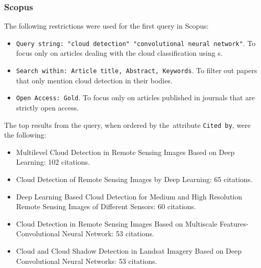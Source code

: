 \subsubsection{Scopus}
\label{cloud-detection-scopus}

The following restrictions were used for the first query in Scopus:

\begin{itemize}
	\item \verb|Query string: "cloud detection" "convolutional neural network"|. To focus on\-ly on articles dealing with the cloud classification using s.
	\item \verb|Search within: Article title, Abstract, Keywords|. To filter out papers that only mention cloud detection in their bodies.
	\item \verb|Open Access: Gold|. To focus only on articles published in journals that are strictly open access.
\end{itemize}

\noindent The top results from the query, when ordered by the~attribute \verb|Cited by|, were the following:

\begin{itemize}
	\item Multilevel Cloud Detection in Remote Sensing Images Based on Deep Learning: 102 citations. \cite{multilevel-cloud-cnn-slic}
	\item Cloud Detection of Remote Sensing Images by Deep Learning: 65 citations. \cite{cloud-detection-dl}
	\item Deep Learning Based Cloud Detection for Medium and High Resolution Remote Sensing Images of Different Sensors: 60 citations. \cite{mscff}
	\item Cloud Detection in Remote Sensing Images Based on Multiscale Features-Convolutional Neural Network: 53 citations. \cite{mf-cnn}
	\item Cloud and Cloud Shadow Detection in Landsat Imagery Based on Deep Convolutional Neural Networks: 53 citations. \cite{cloud-detection-cnn-landsat}
\end{itemize}

